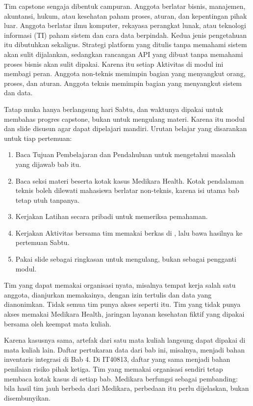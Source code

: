 Tim capstone sengaja dibentuk campuran. Anggota berlatar bisnis, manajemen,
akuntansi, hukum, atau kesehatan paham proses, aturan, dan kepentingan pihak
luar. Anggota berlatar ilmu komputer, rekayasa perangkat lunak, atau teknologi
informasi (TI) paham sistem dan cara data berpindah. Kedua jenis pengetahuan itu
dibutuhkan sekaligus. Strategi platform yang ditulis tanpa memahami sistem akan
sulit dijalankan, sedangkan rancangan API yang dibuat tanpa memahami proses
bisnis akan sulit dipakai. Karena itu setiap Aktivitas di modul ini membagi
peran. Anggota non-teknis memimpin bagian yang menyangkut orang, proses, dan
aturan. Anggota teknis memimpin bagian yang menyangkut sistem dan data.

Tatap muka hanya berlangsung hari Sabtu, dan waktunya dipakai untuk membahas
progres capstone, bukan untuk mengulang materi. Karena itu modul dan slide
disusun agar dapat dipelajari mandiri. Urutan belajar yang disarankan untuk tiap
pertemuan:

\begin{enumerate}
  \item Baca Tujuan Pembelajaran dan Pendahuluan untuk mengetahui masalah yang
        dijawab bab itu.
  \item Baca seksi materi beserta kotak kasus Medikara Health. Kotak pendalaman
        teknis boleh dilewati mahasiswa berlatar non-teknis, karena isi utama
        bab tetap utuh tanpanya.
  \item Kerjakan Latihan secara pribadi untuk memeriksa pemahaman.
  \item Kerjakan Aktivitas bersama tim memakai berkas di
        , lalu bawa hasilnya ke pertemuan Sabtu.
  \item Pakai slide sebagai ringkasan untuk mengulang, bukan sebagai pengganti
        modul.
\end{enumerate}

\begin{kasus}[title={Kasus Medikara Health: Kasus Cadangan bagi Tim Tanpa Akses}]
Tim yang dapat memakai organisasi nyata, misalnya tempat kerja salah satu
anggota, dianjurkan memakainya, dengan izin tertulis dan data yang dianonimkan.
Tidak semua tim punya akses seperti itu. Tim yang tidak punya akses memakai
Medikara Health, jaringan layanan kesehatan fiktif yang dipakai bersama oleh
keempat mata kuliah.

Karena kasusnya sama, artefak dari satu mata kuliah langsung dapat dipakai di
mata kuliah lain. Daftar pertukaran data dari bab ini, misalnya, menjadi bahan
inventaris integrasi di Bab 4. Di IT40813, daftar yang sama menjadi bahan
penilaian risiko pihak ketiga. Tim yang memakai organisasi sendiri tetap membaca
kotak kasus di setiap bab. Medikara berfungsi sebagai pembanding: bila hasil tim
jauh berbeda dari Medikara, perbedaan itu perlu dijelaskan, bukan disembunyikan.
\end{kasus}

